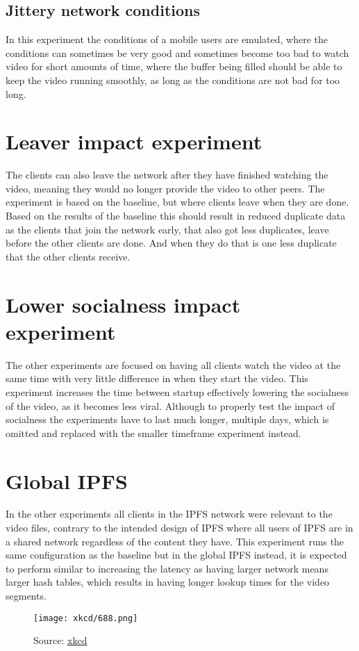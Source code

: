 \subsection{Jittery network conditions}
In this experiment the conditions of a mobile users are emulated, where the conditions can sometimes be very good and sometimes become too bad to watch video for short amounts of time, where the buffer being filled should be able to keep the video running smoothly, as long as the conditions are not bad for too long.

\section{Leaver impact experiment}
The clients can also leave the network after they have finished watching the video, meaning they would no longer provide the video to other peers. The experiment is based on the baseline, but where clients leave when they are done. Based on the results of the baseline this should result in reduced duplicate data as the clients that join the network early, that also got less duplicates, leave before the other clients are done. And when they do that is one less duplicate that the other clients receive.

\section{Lower socialness impact experiment}
The other experiments are focused on having all clients watch the video at the same time with very little difference in when they start the video. This experiment increases the time between startup effectively lowering the socialness of the video, as it becomes less viral. Although to properly test the impact of socialness the experiments have to last much longer, multiple days, which is omitted and replaced with the smaller timeframe experiment instead.

\section{Global IPFS}
In the other experiments all clients in the \acs{IPFS} network were relevant to the video files, contrary to the intended design of \acs{IPFS} where all users of \acs{IPFS} are in a shared network regardless of the content they have. This experiment runs the same configuration as the baseline but in the global \acs{IPFS} instead, it is expected to perform similar to increasing the latency as having larger network means larger hash tables, which results in having longer lookup times for the video segments.

\begin{figure}[h]
    \centering
    \texttt{[image: xkcd/688.png]}
    \caption*{Source: \href{https://xkcd.com/688/}{xkcd}}
\end{figure}


